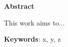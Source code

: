 \begin{center}

\huge
\textbf{Abstract}

\end{center}

This work aims to...
    
\vspace \onelineskip

\noindent

\textbf{Keywords}: x, y, z

